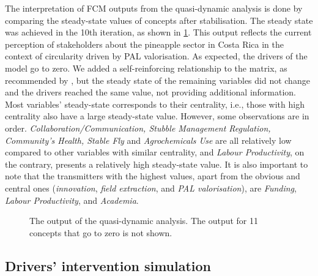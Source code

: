 The interpretation of FCM outputs from the quasi-dynamic analysis is done by comparing the steady-state values of concepts after stabilisation. The steady state was achieved in the 10th iteration, as shown in \cref{outputFCM0}. This output reflects the current perception of stakeholders about the pineapple sector in Costa Rica in the context of circularity driven by PAL valorisation. As expected, the drivers of the model go to zero. We added a self-reinforcing relationship to the matrix, as recommended by \cite{diniz2015mapping}, but the steady state of the remaining variables did not change and the drivers reached the same value, not providing additional information. Most variables' steady-state corresponds to their centrality, i.e., those with high centrality also have a large steady-state value. However, some observations are in order. \textit{Collaboration/Communication, Stubble Management Regulation, Community's Health, Stable Fly} and \textit{Agrochemicals Use} are all relatively low compared to other variables with similar centrality, and \textit{Labour Productivity}, on the contrary, presents a relatively high steady-state value. It is also important to note that the transmitters with the highest values, apart from the obvious and central ones (\textit{innovation}, \textit{field extraction}, and \textit{PAL valorisation}), are \textit{Funding}, \textit{Labour Productivity}, and \textit{Academia}. 


\begin{figure}[H]
\caption[Output of the quasi-dynamic analysis]{The output of the quasi-dynamic analysis. The output for 11 concepts that go to zero is not shown.}  
\label{outputFCM0}
\centering

\end{figure}


\subsection{Drivers' intervention simulation}

